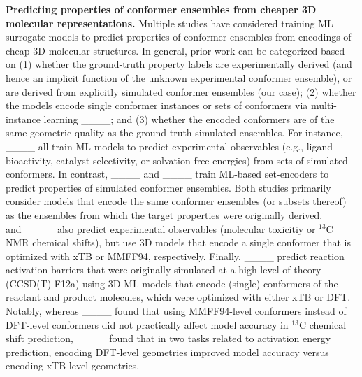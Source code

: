 \textbf{Predicting properties of conformer ensembles from cheaper 3D molecular representations.}
Multiple studies have considered training ML surrogate models to predict properties of conformer ensembles from encodings of cheap 3D molecular structures. In general, prior work can be categorized based on (1) whether the ground-truth property labels are experimentally derived (and hence an implicit function of the unknown experimental conformer ensemble), or are derived from explicitly simulated conformer ensembles (our case); (2) whether the models encode single conformer instances or sets of conformers via multi-instance learning ____; and (3) whether the encoded conformers are of the same geometric quality as the ground truth simulated ensembles. For instance, ____ all train ML models to predict experimental observables (e.g., ligand bioactivity, catalyst selectivity, or solvation free energies) from sets of simulated conformers. In contrast, ____ and ____ train ML-based set-encoders to predict properties of simulated conformer ensembles. Both studies primarily consider models that encode the same conformer ensembles (or subsets thereof) as the ensembles from which the target properties were originally derived. ____ and ____ also predict experimental observables (molecular toxicitiy or $^{13}$C NMR chemical shifts), but use 3D models that encode a single conformer that is optimized with xTB or MMFF94, respectively. Finally, ____ predict reaction activation barriers that were originally simulated at a high level of theory (CCSD(T)-F12a) using 3D ML models that encode (single) conformers of the reactant and product molecules, which were optimized with either xTB or DFT. Notably, whereas ____ found that using MMFF94-level conformers instead of DFT-level conformers did not practically affect model accuracy in $^{13}$C chemical shift prediction, ____ found that in two tasks related to activation energy prediction, encoding DFT-level geometries improved model accuracy versus encoding xTB-level geometries.